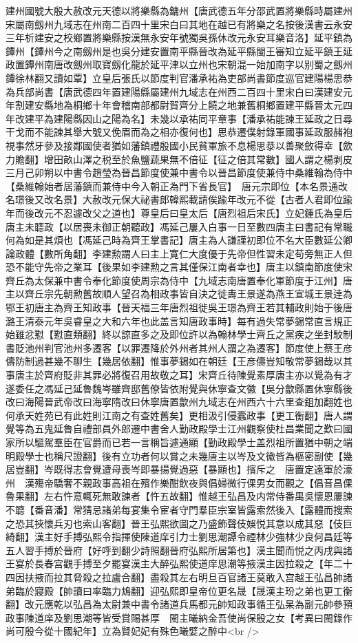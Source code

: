 建州國號大殷大赦改元天德以將樂縣為鏞州【唐武德五年分邵武置將樂縣時屬建州宋屬南劔州九域志在州南二百四十里宋白曰其地在越已有將樂之名按後漢書云永安三年析建安之校鄉置將樂縣按漢無永安年號獨吳孫休改元永安耳樂音洛】延平鎮為鐔州【鐔州今之南劔州是也吳分建安置南平縣晉改為延平縣閩王審知立延平鎮王延政置鐔州南唐改劔州取寶劔化龍於延平津以立州也宋朝混一始加南字以别蜀之劔州鐔徐林翻又讀如覃】立皇后張氏以節度判官潘承祐為吏部尚書節度巡官建陽楊思恭為兵部尚書【唐武德四年置建陽縣屬建州九域志在州西二百四十里宋白曰漢建安元年割建安縣地為桐鄉十年會稽南部都尉賀齊分上饒之地兼舊桐鄉置建平縣晉太元四年改建平為建陽縣因山之陽為名】未幾以承祐同平章事【潘承祐能諫王延政之日尋干戈而不能諫其舉大號又俛眉而為之相亦復何也】思恭遷僕射錄軍國事延政服赭袍視事然牙參及接鄰國使者猶如藩鎮禮殷國小民貧軍旅不息楊思㳟以善聚斂得幸【歛力贍翻】增田畝山澤之税至於魚鹽蔬果無不倍征【征之倍其常數】國人謂之楊剥皮三月己卯朔以中書令趙瑩為晉昌節度使兼中書令以晉昌節度使兼侍中桑維翰為侍中【桑維翰始者居藩鎮而兼侍中今入朝正為門下省長官】　唐元宗即位【本名景通改名璟後又改名景】大赦改元保大祕書郎韓熙載請俟踰年改元不從【古者人君即位踰年而後改元不忍遽改父之道也】尊皇后曰皇太后【唐烈祖后宋氏】立妃鍾氏為皇后唐主未聼政【以居喪未御正朝聽政】馮延己屢入白事一日至數四唐主曰書記有常職何為如是其煩也【馮延己時為齊王掌書記】唐主為人謙謹初即位不名大臣數延公卿論政體【數所角翻】李建勲謂人曰主上寛仁大度優于先帝但性習未定苟旁無正人但恐不能守先帝之業耳【後果如李建勲之言其僅保江南者幸也】唐主以鎮南節度使宋齊丘為太保兼中書令奉化節度使周宗為侍中【九域志南唐置奉化軍節度于江州】唐主以齊丘宗先朝勲舊故順人望召為相政事皆自決之徙夀王景遂為燕王宣城王景逹為鄂王初唐主為齊王知政事【晉天福三年唐烈祖徙吳王璟為齊王若其輔政則始于後唐潞王清泰元年吳睿皇之大和六年也此盖言知唐政事時】每有過失常夢錫常直言規正始雖忿懟【懟直類翻】終以諒直多之及即位許以為翰林學士齊丘之黨疾之坐封駮制書貶池州判官池州多遷客【以罪遷降於外州者其州人謂之為遷客】節度使上蔡王彦儔防制過甚幾不聊生【幾居依翻】惟事夢錫如在朝廷【王彦儔豈知敬常夢錫哉以其事唐主於齊府貶非其罪必將復召用故敬之耳】宋齊丘待陳覺素厚唐主亦以覺為有才遂委任之馮延己延魯魏岑雖齊邸舊僚皆依附覺與休寧查文徽【吳分歙縣置休寧縣後改曰海陽晉武帝改曰海寧隋改曰休寧唐置歙州九域志在州西六十六里查鉏加翻姓也何承天姓苑已有此姓則江南之有查姓舊矣】更相汲引侵蠧政事【更工衡翻】唐人謂覺等為五鬼延魯自禮部員外郎遷中書舍人勤政殿學士江州觀察使杜昌業聞之歎曰國家所以驅駕羣臣在官爵而已若一言稱旨遽通顯【勤政殿學士盖烈祖所置猶中朝之端明殿學士也稱尺證翻】後有立功者何以賞之未幾唐主以岑及文徽皆為樞密副使【幾居豈翻】岑既得志會覺遭母喪岑即暴揚覺過惡【暴顯也】擯斥之　唐置定遠軍於濠州　漢殤帝驕奢不親政事高祖在殯作樂酣飲夜與倡婦微行倮男女而觀之【倡音昌倮魯果翻】左右忤意輒死無敢諫者【忤五故翻】惟越王弘昌及内常侍番禺吳懷恩屢諫不聼【番音潘】常猜忌諸弟每宴集令宦者守門羣臣宗室皆露索然後入【露體而搜索之恐其挾懷兵刃也索山客翻】晉王弘熙欲圖之乃盛飾聲伎娛悦其意以成其惡【伎巨綺翻】漢主好手搏弘熙令指揮使陳道庠引力士劉思潮譚令禋林少強林少良何昌廷等五人習手搏於晉府【好呼到翻少詩照翻晉府弘熙所居第也】漢主聞而悦之丙戌與諸王宴於長春宫觀手搏至夕罷宴漢主大醉弘熙使道庠思潮等掖漢主因拉殺之【年二十四因扶掖而拉其脅殺之拉盧合翻】盡殺其左右明旦百官諸王莫敢入宫越王弘昌帥諸弟臨於寢殿【帥讀曰率臨力鴆翻】迎弘熙即皇帝位更名晟【晟漢主玢之弟也更工衡翻】改元應乾以弘昌為太尉兼中書令諸道兵馬都元帥知政事循王弘杲為副元帥參預政事陳道庠及劉思潮等皆受賞賜甚厚　閩主曦納金吾使尚保殷之女【考異曰閩錄作尚可殷今從十國紀年】立為賢妃妃有殊色曦嬖之醉中<br />
